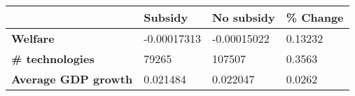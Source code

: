 \begin{tabular}{|l|l|l|l|}
\hline
&\textbf{Subsidy}&\textbf{No subsidy}&\textbf{\% Change}\\\hline
\textbf{Welfare}&-0.00017313&-0.00015022&0.13232\\\hline
\textbf{\# technologies}&79265&107507&0.3563\\\hline
\textbf{Average GDP growth}&0.021484&0.022047&0.0262\\\hline
\end{tabular}
